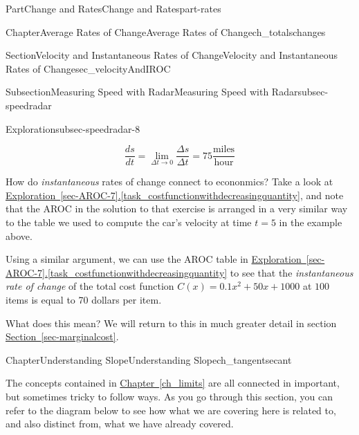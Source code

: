 \documentclass[oneside,10pt,]{tufte-book}
\newcommand{\xreffont}{\relax}
\numberwithin{equation}{chapter}
\begin{document}
\begin{partptx}{Part}{Change and Rates}{}{Change and Rates}{}{}{part-rates}
\begin{chapterptx}{Chapter}{Average Rates of Change}{}{Average Rates of Change}{}{}{ch_totalschanges}
\begin{sectionptx}{Section}{Velocity and Instantaneous Rates of Change}{}{Velocity and Instantaneous Rates of Change}{}{}{sec_velocityAndIROC}
\begin{subsectionptx}{Subsection}{Measuring Speed with Radar}{}{Measuring Speed with Radar}{}{}{subsec-speedradar}
\begin{exploration}{Exploration}{}{subsec-speedradar-8}
\begin{enumerate}[font=\bfseries,label=(\alph*),ref=\alph*]
\begin{equation*}
\dfrac{ds}{dt} = \lim_{\Delta t\rightarrow 0} \dfrac{\Delta s}{\Delta t} = 75 \frac{\text{miles}}{\text{hour}}
\end{equation*}
%
\end{enumerate}%
\end{exploration}%
\end{subsectionptx}
How do \emph{instantaneous} rates of change connect to econonmics? Take a look at \hyperref[task_costfunctionwithdecreasingquantity]{Exploration~{\xreffont\ref{sec-AROC-7}}.{\xreffont\ref{task_costfunctionwithdecreasingquantity}}}, and note that the AROC in the solution to that exercise is arranged in a very similar way to the table we used to compute the car's velocity at time \(t=5\) in the example above.%
\par
Using a similar argument, we can use the AROC table in \hyperref[task_costfunctionwithdecreasingquantity]{Exploration~{\xreffont\ref{sec-AROC-7}}.{\xreffont\ref{task_costfunctionwithdecreasingquantity}}} to see that the \emph{instantaneous rate of change} of the total cost function \(C(x)=0.1x^2+50x+1000\) at \(100\) items is equal to 70 dollars per item.%
\par
What does this mean?  We will return to this in much greater detail in section \hyperref[sec-marginalcost]{Section~{\xreffont\ref{sec-marginalcost}}}.%
\end{sectionptx}
\end{chapterptx}
%
\typeout{************************************************}
\typeout{************************************************}
%
\begin{chapterptx}{Chapter}{Understanding Slope}{}{Understanding Slope}{}{}{ch_tangentsecant}
\renewcommand*{\chaptername}{Chapter}
\begin{introduction}{}%
The concepts contained in \hyperref[ch_limits]{Chapter~{\xreffont\ref{ch_limits}}\textendash{}{\xreffont\ref{ch_tangentsecant}}} are all connected in important, but sometimes tricky to follow ways.  As you go through this section, you can refer to the diagram below to see how what we are covering here is related to, and also distinct from, what we have already covered.%
\begin{image}{0}{1}{0}{}%
\end{image}
\end{introduction}
\end{chapterptx}
\end{partptx}
\end{document}
